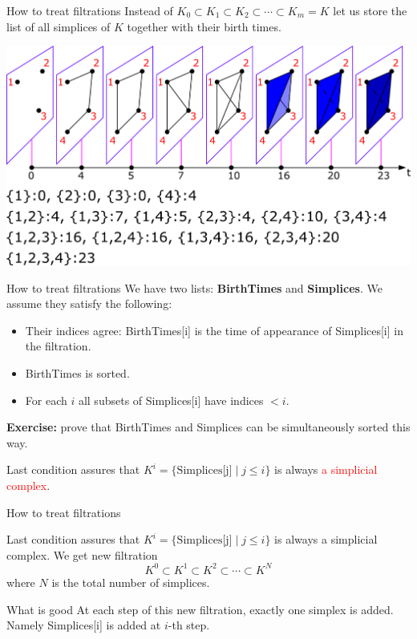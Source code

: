 \documentclass[10pt,xcolor={usenames}]{beamer}
\begin{document}
\begin{frame}{How to treat filtrations}
Instead of $K_0\subset K_1\subset K_2\subset\cdots\subset K_m=K$ let us store the list of all simplices of $K$ together with their birth times.

\begin{center}
\includegraphics[scale=0.17]{pictures/filtration3.pdf}
\end{center}

\end{frame}


\begin{frame}{How to treat filtrations}
We have two lists: \textbf{BirthTimes} and \textbf{Simplices}. We assume they satisfy the following:
\begin{itemize}
  \item Their indices agree: BirthTimes[i] is the time of appearance of Simplices[i] in the filtration.\pause
  \item BirthTimes is sorted.\pause
  \item For each $i$ all subsets of Simplices[i] have indices $<i$.
\end{itemize}
\pause

\textbf{Exercise:} prove that BirthTimes and Simplices can be simultaneously sorted this way.
\pause

Last condition assures that $K^i=\{\mbox{Simplices[j]}\mid j\leqslant i\}$ is always \textcolor{red}{a simplicial complex}.

\end{frame}

\begin{frame}{How to treat filtrations}

Last condition assures that $K^i=\{\mbox{Simplices[j]}\mid j\leqslant i\}$ is always a simplicial complex. We get new filtration
\[
K^0\subset K^1\subset K^2\subset\cdots\subset K^N
\]
where $N$ is the total number of simplices.

\begin{block}{What is good}
At each step of this new filtration, exactly one simplex is added. Namely Simplices[i] is added at $i$-th step.
\end{block}

\end{frame}
\end{document}

